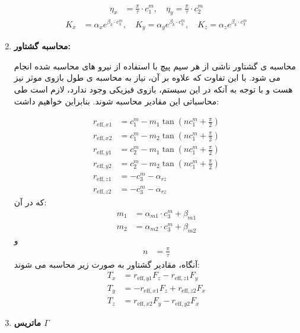 \begin{enumerate}
	\begin{align}
		\eta_x &= \frac{\pi}{\tau} \cdot c^{m}_1, \quad 
		\eta_y = \frac{\pi}{\tau} \cdot c^{m}_2
	\end{align}
	\begin{align}
		K_x &= \alpha_x e^{\beta_k \cdot c^{m}_3}, \quad
		K_y = \alpha_y e^{\beta_k \cdot c^{m}_3}, \quad
		K_z = \alpha_z e^{\beta_k \cdot c^{m}_3}
	\end{align}
	\item \textbf{محاسبه گشتاور:}
	
	محاسبه ی گشتاور ناشی از هر سیم پیچ با استفاده از نیرو های محاسبه شده انجام می شود. با این تفاوت که علاوه بر آن، نیاز به محاسبه ی طول بازوی موثر نیز هست و با توجه به آنکه در این سیستم، بازوی فیزیکی وجود ندارد، لازم است طی محاسباتی این مقادیر محاسبه شوند. بنابراین خواهیم داشت:
	
	\begin{align}
		r_{\text{eff},x1} &= c^{m}_1 - m_1 \tan(n c^{m}_1 + \frac{\pi}{2}) \\
		r_{\text{eff},x2} &= c^{m}_1 - m_2 \tan(n c^{m}_1 + \frac{\pi}{2}) \\
		r_{\text{eff},y1} &= c^{m}_2 - m_1 \tan(n c^{m}_1 + \frac{\pi}{2}) \\
		r_{\text{eff},y2} &= c^{m}_2 - m_2 \tan(n c^{m}_1 + \frac{\pi}{2}) \\
		r_{\text{eff},z1} &= -c^{m}_3 - \alpha_{rz} \\
		r_{\text{eff},z2} &= -c^{m}_3 - \alpha_{rz}
	\end{align}
	که در آن:
	\begin{align}
		m_1 &= \alpha_{m1} \cdot c^{m}_3 + \beta_{m1} \\
		m_2 &= \alpha_{m2} \cdot c^{m}_3 + \beta_{m2}
	\end{align}
	و
	\begin{align}
		n &= \frac{\pi}{\tau}
	\end{align}
	آنگاه، مقادیر گشتاور به صورت زیر محاسبه می شوند:
	\begin{align}
		T_x &= r_{\text{eff},y1} F_z - r_{\text{eff},z1} F_y \\
		T_y &= -r_{\text{eff},x1} F_z + r_{\text{eff},z2} F_x \\
		T_z &= r_{\text{eff},x2} F_y - r_{\text{eff},y2} F_x
	\end{align}
	
	\item \textbf{ماتریس $\Gamma$}
	

\end{enumerate}
